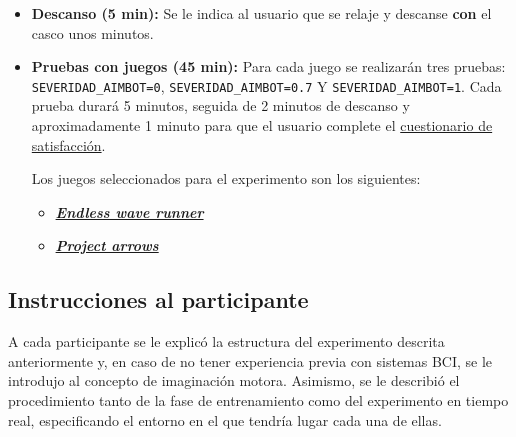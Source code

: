 \begin{itemize}
            \begin{enumerate}
                  \item Realice imaginación motora de mano derecha hasta rellenar la flecha por
                        completo.
                  \item Repita tres veces consecutivas lo siguiente: imaginación motora de mano
                        izquierda hasta rellenar la flecha izquierda, imaginación motora de mano
                        derecha hasta llenar la flecha derecha.
                  \item En caso de que el usuario no logre rellenar las tres iteraciones completando
                        las flechas, deberá descansar 5 minutos y repetir desde el paso de
                        entrenamiento anteriormente mencionado.
            \end{enumerate}
      \item \textbf{Descanso (5 min):} Se le indica al usuario que se relaje y descanse \textbf{con} el casco unos minutos.
      \item \textbf{Pruebas con juegos (45 min):} Para cada juego se realizarán tres pruebas: \texttt{SEVERIDAD\_AIMBOT=0}, \texttt{SEVERIDAD\_AIMBOT=0.7} Y \texttt{SEVERIDAD\_AIMBOT=1}. Cada prueba durará 5 minutos, seguida de 2 minutos de descanso y aproximadamente 1 minuto para que el usuario complete el \hyperref[subsec:rt_cuestionario_satisfacción]{cuestionario de satisfacción}.

            Los juegos seleccionados para el experimento son los siguientes:
            \begin{itemize}
                  \item \textbf{\textit{\hyperref[subsec:endless_wave_runner]{Endless wave runner}}}
                  \item \textbf{\textit{\hyperref[subsec:project_arrows]{Project arrows}}}
            \end{itemize}
\end{itemize}

\subsection{Instrucciones al participante}
\label{subsec:rt_instrucciones}
A cada participante se le explicó la estructura del experimento descrita
anteriormente y, en caso de no tener experiencia previa con sistemas BCI, se le introdujo al concepto de imaginación motora. Asimismo, se le describió el procedimiento tanto de la fase de entrenamiento como del experimento en tiempo real, especificando el entorno en el que tendría lugar cada una de ellas.

